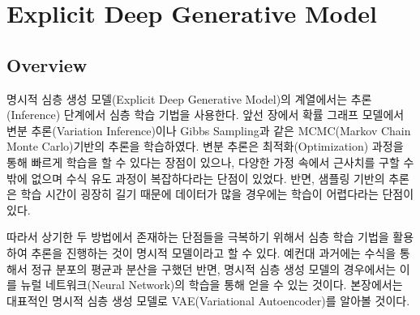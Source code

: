 \documentclass[draft=false]{oblivoir}
\begin{document}
\section{Explicit Deep Generative Model}

\subsection{Overview}
명시적 심층 생성 모델(Explicit Deep Generative Model)의 계열에서는 추론(Inference) 단계에서 심층 학습 기법을 사용한다. 앞선 장에서 확률 그래프 모델에서 변분 추론(Variation Inference)이나 Gibbs Sampling과 같은 MCMC(Markov Chain Monte Carlo)기반의 추론을 학습하였다. 변분 추론은 최적화(Optimization) 과정을 통해 빠르게 학습을 할 수 있다는 장점이 있으나, 다양한 가정 속에서 근사치를 구할 수 밖에 없으며 수식 유도 과정이 복잡하다라는 단점이 있었다. 반면, 샘플링 기반의 추론은 학습 시간이 굉장히 길기 때문에 데이터가 많을 경우에는 학습이 어렵다라는 단점이 있다.

따라서 상기한 두 방법에서 존재하는 단점들을 극복하기 위해서 심층 학습 기법을 활용하여 추론을 진행하는 것이 명시적 모델이라고 할 수 있다.  예컨대 과거에는 수식을 통해서 정규 분포의 평균과 분산을 구했던 반면, 명시적 심층 생성 모델의 경우에서는 이를 뉴럴 네트워크(Neural Network)의 학습을 통해 얻을 수 있는 것이다. 본장에서는 대표적인 명시적 심층 생성 모델로 VAE(Variational Autoencoder)를 알아볼 것이다.

\end{document}
